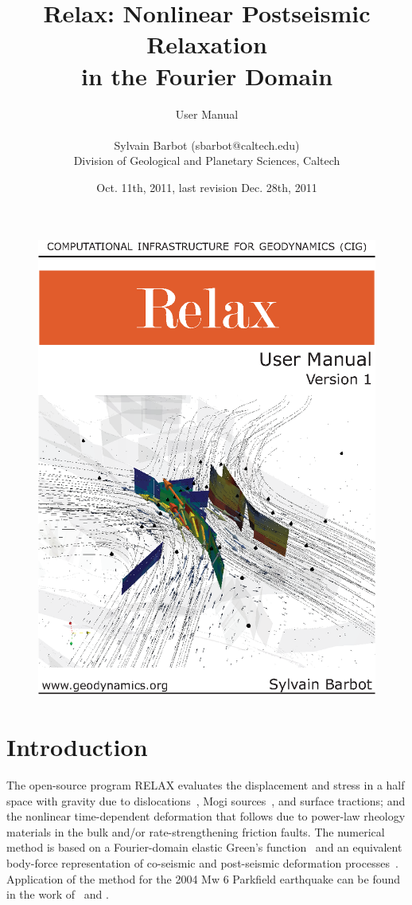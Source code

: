 \documentclass[10pt]{article}
\title{\bf Relax: Nonlinear Postseismic Relaxation\\in the Fourier Domain}
\author
{User Manual\\
\\
\normalsize{Sylvain Barbot (sbarbot@caltech.edu)}\\
\normalsize{Division of Geological and Planetary Sciences, Caltech}\\
}
\date{Oct. 11th, 2011, last revision Dec. 28th, 2011}
\begin{document}
 


\thispagestyle{empty}
\begin{figure}[!h]
\centering\includegraphics[width=15.1cm]{cover.eps}
\end{figure}
\pagebreak

\maketitle 


\vspace{1cm}


\pagestyle{fancy}
\cfoot{\thepage}

\section{Introduction}

The open-source program RELAX evaluates the displacement and stress in a half space with gravity due to dislocations~\citep[e.g.,][]{okada92}, Mogi sources~\citep{mogi58}, and surface tractions; and the nonlinear time-dependent deformation that follows due to power-law rheology materials in the bulk and/or rate-strengthening friction faults. The numerical method is based on a Fourier-domain elastic Green's function~\citep{barbot+09b,barbot&fialko10a} and an equivalent body-force representation of co-seismic and post-seismic deformation processes~\citep{barbot+09a,barbot&fialko10b}. Application of the method for the 2004 Mw 6 Parkfield earthquake can be found in the work of~\cite{barbot+09a} and \cite{bruhat+11}. 
\end{document}
